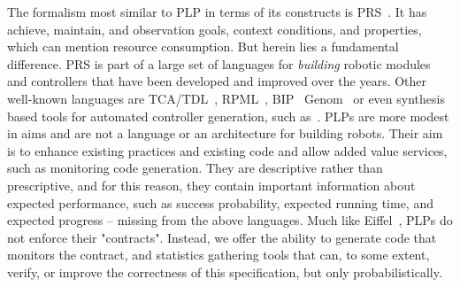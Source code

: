 \documentclass[ 5p, 12pt, times, twocolumn, sort&compress ]{elsarticle}
\begin{document}

The formalism most similar to PLP in terms of its constructs is  PRS~\cite{PRS}. It has achieve, maintain, and observation goals, context conditions, and properties, which can mention resource consumption. But herein lies a fundamental difference.
PRS is part of a large set of languages for {\em building\/} robotic modules and controllers that have been developed and improved
over the years. Other well-known languages are TCA/TDL~\cite{TCA}, RPML~\cite{RPML},  BIP~\cite{BIP2}  %
Genom~\cite{Genom}  or even synthesis based tools for automated controller generation, such as~\cite{KP10}.
%
%
%
PLPs are more modest in aims and are not a language or an architecture for building robots.
Their aim is to enhance existing practices and existing code and allow added value services, such as monitoring code generation. 
They are descriptive rather than prescriptive, and for this reason, they contain important information about expected performance, such as success probability, expected running time, and expected progress -- missing from the above languages.  
Much like Eiffel~\cite{Eiffel}, PLPs do not enforce their "contracts".
Instead, we offer the ability to generate code that monitors the contract, and statistics gathering tools that can, to some extent, 
verify, or improve the correctness of this specification, but only probabilistically. 
\end{document}
